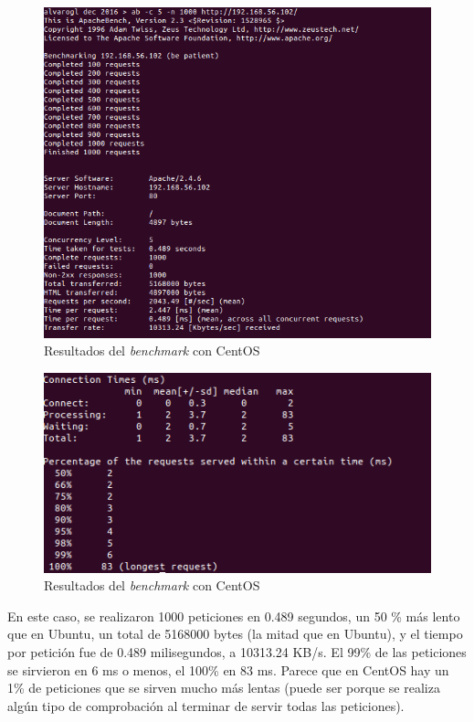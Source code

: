\begin{figure}[H]
	\centering
	\includegraphics[scale=0.6]{cuestion3-02.png}
	\caption{Resultados del \textit{benchmark} con CentOS} \label{cuestion3-02}
\end{figure}

\begin{figure}[H]
	\centering
	\includegraphics[scale=0.6]{cuestion3-03.png}
	\caption{Resultados del \textit{benchmark} con CentOS} \label{cuestion3-03}
\end{figure}

En este caso, se realizaron 1000 peticiones en 0.489 segundos, un 50 \% más lento que en Ubuntu, un total de 5168000 bytes (la mitad que en Ubuntu), y el tiempo por petición fue de 0.489 milisegundos, a 10313.24 KB/s. El 99\% de las peticiones se sirvieron en 6 ms o menos, el 100\% en 83 ms.
Parece que en CentOS hay un 1\% de peticiones que se sirven mucho más lentas (puede ser porque se realiza algún tipo de comprobación al terminar de servir todas las peticiones).


